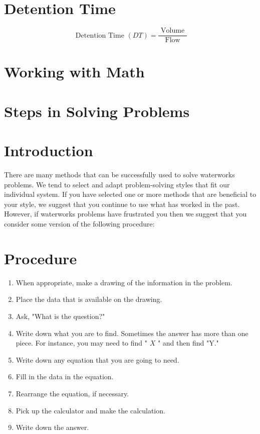 \documentclass[10pt]{article}
\begin{document}
\section{Detention Time}
$$
\text { Detention Time }(D T)=\frac{\text { Volume }}{\text { Flow }}
$$

\section{Working with Math}
\section{Steps in Solving Problems}
\section{Introduction}
There are many methods that can be successfully used to solve waterworks problems. We tend to select and adapt problem-solving styles that fit our individual system. If you have selected one or more methods that are beneficial to your style, we suggest that you continue to use what has worked in the past. However, if waterworks problems have frustrated you then we suggest that you consider some version of the following procedure:

\section{Procedure}
\begin{enumerate}
  \item When appropriate, make a drawing of the information in the problem.

  \item Place the data that is available on the drawing.

  \item Ask, "What is the question?"

  \item Write down what you are to find. Sometimes the answer has more than one piece. For instance, you may need to find " $X$ " and then find "Y."

  \item Write down any equation that you are going to need.

  \item Fill in the data in the equation.

  \item Rearrange the equation, if necessary.

  \item Pick up the calculator and make the calculation.

  \item Write down the answer.

\end{enumerate}
\end{document}
